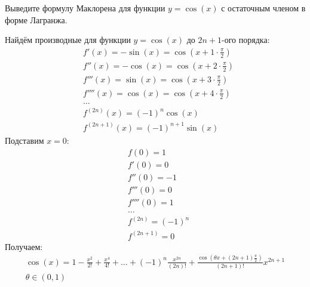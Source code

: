 \begin{question}
    Выведите формулу Маклорена для функции $y = \cos(x)$ с остаточным членом в форме Лагранжа.
\end{question}
\begin{answer}
    Найдём производные для функции $y = \cos(x)$ до $2n + 1$-ого порядка:
    \begin{align*}
        &f'(x) = -\sin(x) = \cos(x + 1 \cdot \frac{\pi}{2}) \\
        &f''(x) = -\cos(x) = \cos(x + 2 \cdot \frac{\pi}{2}) \\
        &f'''(x) = \sin(x) = \cos(x + 3 \cdot \frac{\pi}{2}) \\
        &f''''(x) = \cos(x) = \cos(x + 4 \cdot \frac{\pi}{2}) \\
        &\ldots \\
        &f ^{(2n)}(x) = (-1) ^{n} \cos(x) \\
        &f ^{(2n+1)}(x) = (-1) ^{n+1} \sin(x)
    \end{align*}
    Подставим $x = 0$:
    \begin{align*}
        &f(0) = 1 \\
        &f'(0) = 0 \\
        &f''(0) = -1 \\
        &f'''(0) = 0 \\
        &f''''(0) = 1 \\
        &\ldots \\
        &f ^{(2n)} = (-1)^{n} \\
        &f ^{(2n+1)} = 0
    \end{align*}
    Получаем:
    \begin{gather*}
        \cos(x) = 1 - \frac{x^2}{2!} + \frac{x^4}{4!} + \ldots + (-1)^{n} \frac{x ^{2n}}{(2n)!} + \frac{\cos\left(\theta x + (2n+1) \frac{\pi}{2}\right)}{(2n+1)!} x ^{2n+1} \\
        \theta \in (0, 1)
    \end{gather*}
\end{answer}
\pagebreak



